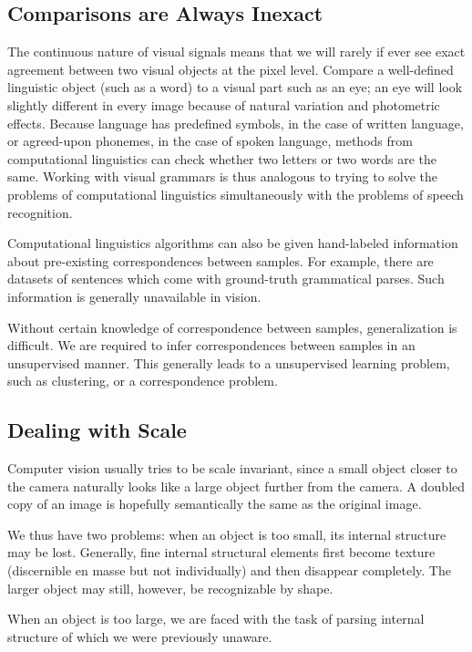\subsection{Comparisons are Always Inexact}

The continuous nature of visual signals means that we will rarely if
ever see exact agreement between two visual objects at the pixel
level. Compare a well-defined linguistic object (such as a word) to a
visual part such as an eye; an eye will look slightly different in
every image because of natural variation and photometric
effects. Because language has predefined symbols, in the case of
written language, or agreed-upon phonemes, in the case of spoken
language, methods from computational linguistics can check whether two
letters or two words are the same. Working with visual grammars is
thus analogous to trying to solve the problems of computational
linguistics simultaneously with the problems of speech recognition.

Computational linguistics algorithms can also be given hand-labeled
information about pre-existing correspondences between samples. For
example, there are datasets of sentences which come with ground-truth
grammatical parses. Such information is generally unavailable in
vision. 

Without certain knowledge of correspondence between samples,
generalization is difficult. We are required to infer correspondences
between samples in an unsupervised manner. This generally leads to a
unsupervised learning problem, such as clustering, or a correspondence
problem.

\subsection{Dealing with Scale}

Computer vision usually tries to be scale invariant, since a small
object closer to the camera naturally looks like a large object
further from the camera. A doubled copy of an image is hopefully
semantically the same as the original image.

We thus have two problems: when an object is too small, its internal
structure may be lost. Generally, fine internal structural elements
first become texture (discernible en masse but not individually) and
then disappear completely. The larger object may still, however, be
recognizable by shape.

When an object is too large, we are faced with the task of parsing
internal structure of which we were previously unaware.

